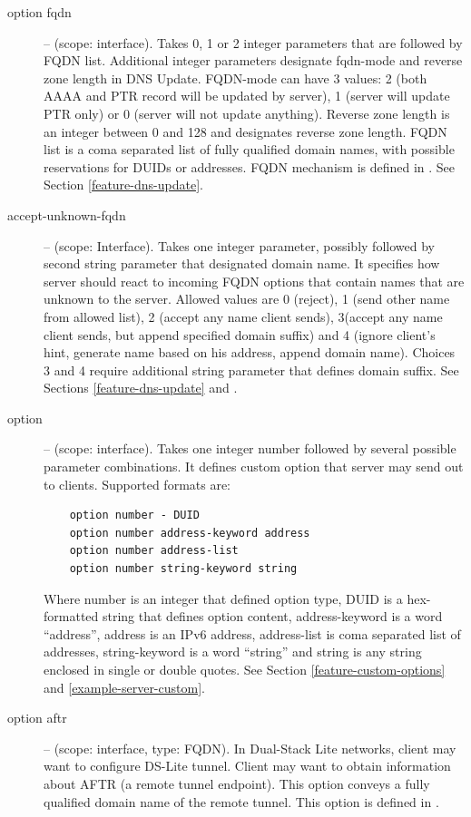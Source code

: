 \begin{description}
 \item[option fqdn] -- (scope: interface). Takes 0, 1 or 2 integer
   parameters that are followed by FQDN list. Additional integer
   parameters designate fqdn-mode and reverse zone length in DNS
   Update. FQDN-mode can have 3 values: 2 (both AAAA and PTR record
   will be updated by server), 1 (server will update PTR only) or
   0 (server will not update anything). Reverse zone length is an
   integer between 0 and 128 and designates reverse zone length. FQDN
   list is a coma separated list of fully qualified domain names, with
   possible reservations for DUIDs or addresses. FQDN mechanism is
   defined in \cite{rfc4704}. See Section \ref{feature-dns-update}.

\item[accept-unknown-fqdn] -- (scope: Interface). Takes one integer
  parameter, possibly followed by second string parameter that
  designated domain name. It specifies how server should react to
  incoming FQDN options that contain names that are unknown to the
  server. Allowed values are 0 (reject), 1 (send other name from
  allowed list), 2 (accept any name client sends), 3(accept any name
  client sends, but append specified domain suffix) and 4 (ignore
  client's hint, generate name based on his address, append domain
  name). Choices 3 and 4 require additional string parameter that
  defines domain suffix. See Sections \ref{feature-dns-update}
  and \label{example-server-fqdn}.

\item[option] -- (scope: interface). Takes one integer number followed
  by several possible parameter combinations. It defines custom
  option that server may send out to clients. Supported formats are:
  \begin{lstlisting}
    option number - DUID
    option number address-keyword address
    option number address-list
    option number string-keyword string
  \end{lstlisting}
Where number is an integer that defined option type, DUID is a
hex-formatted string that defines option content, address-keyword is a
word ``address'', address is an IPv6 address, address-list is coma
separated list of addresses, string-keyword is a word ``string'' and
string is any string enclosed in single or double quotes. See Section
\ref{feature-custom-options} and \ref{example-server-custom}.

 \item[option aftr] -- (scope: interface, type: FQDN). In Dual-Stack Lite
   networks, client may want to configure DS-Lite tunnel. Client may
   want to obtain information about AFTR (a remote tunnel
   endpoint). This option conveys a fully qualified domain name of the
   remote tunnel. This option is defined in \cite{rfc6334}.


\end{description}
